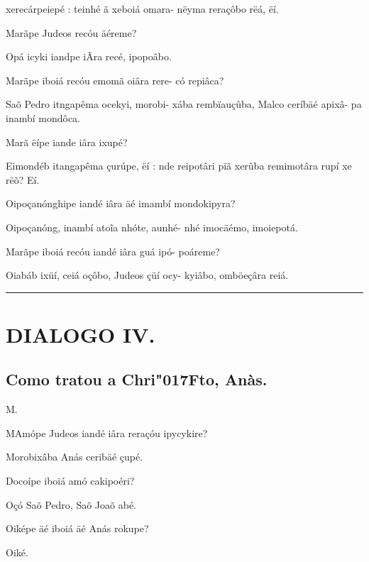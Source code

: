 \documentclass[openany,titlepage,12pt]{book}
\renewcommand{\chaptermark}[1]{\markboth{#1}{}}
\renewcommand{\sectionmark}[1]{\gdef\rightmark{#1}}
\newcommand{\lgS}{\char"017F}
\newcommand{\lgSS}{\char"017F\char"017F}
\newcommand{\comecalista}[5]{
    \hspace*{-11.7pt}
    \begin{minipage}[t]{0.08\linewidth}
        \flushright #1\\#2
    \end{minipage}
    \hspace{0pt}
    \begin{minipage}[t]{0.94\linewidth}
        \lettrine
        [findent =2pt, nindent=0pt,  lines=2]
        {#3}{#4}#5
    \end{minipage}
    \vspace*{-3pt}
}
\begin{document}
\begin{alternate}
    xerecárpeiepé : teinhé ã xeboiá omara-\linebreak
    nëyma reraçôbo rëá, ëí.
    \item Marãpe Judeos recóu äéreme?
    \item Opá icyki iandpe iÂra recé, ipopoâbo.
    \item Marãpe iboiá recóu emomã oiâra rere-
    có repiâca?
    \item Saõ Pedro itngapêma ocekyi, morobi-\pagebreak
    \linebreak xába rembïauçûba, Malco ceríbäé apixâ-
    pa inambí mondôca.
    \item Marã ëípe iande iâra ixupé?
    \item Eimondéb itangapêma çurúpe, ëí : nde
    reipotâri pïã xerûba remimotâra rupí xe
    rëõ? Eí.
    \item Oipoçanónghipe iandé iâra äé imambí
    mondokipyra?
    \item Oipoçanóng, inambí ato\~ia nhóte, aunhé-
    nhé imocäémo, imoiepotá.
    \item Marãpe iboiá recóu iandé iâra guá ipó-
    poáreme?
    \item Oiabáb ixüí, ceiá oçôbo, Judeos çüí ocy-
    kyiâbo, omböeçâra reiá.
    

\end{alternate}


\vspace{2pt}
\par\noindent\rule{\textwidth}{0.4pt}
\unskip\vspace*{2pt}
\section{DIALOGO IV.}
\subsection{Como tratou a Chri\lgS to, Anàs.}

\chaptermark{Dialogo III.}
\sectionmark{Do que pa\lgSS ou com Anás}
\vspace*{2pt}

\comecalista{M.}{}{M}{A}
    {mópe Judeos iandé iâra reraçóu
    \hspace*{2ex} ipycykire?
    }
\begin{altereven}
    \item Morobixâba Anás ceribäé çupé.
    \item Docoípe iboiá amó cakipoéri?
    \item Oçó Saõ Pedro, Saõ Joaõ abé.
    \item Oiképe äé iboiá äé Anás rokupe?
    \item Oiké.
    \item 
\end{altereven}
\end{document}

